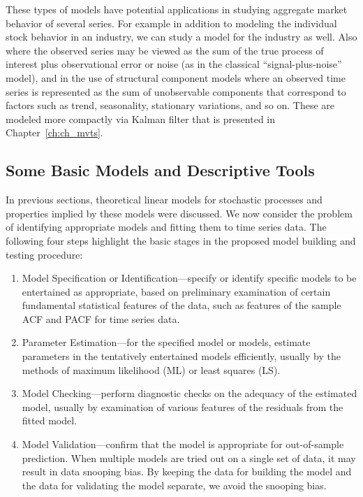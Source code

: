 These types of models have potential applications in studying aggregate market behavior of several series. For example in addition to modeling the individual stock behavior in an industry, we can study a model for the industry as well. Also where the observed series may be viewed as the sum of the true process of interest plus observational error or noise (as in the classical ``signal-plus-noise'' model), and in the use of structural component models where an observed time series is represented as the sum of unobservable components that correspond to factors such as trend, seasonality, stationary variations, and so on. These are modeled more compactly via Kalman filter that is presented in Chapter~\ref{ch:ch_mvts}. 



\subsection{Some Basic Models and Descriptive Tools}


In previous sections, theoretical linear models for stochastic processes and properties implied by these models were discussed. We now consider the problem of identifying appropriate models and fitting them to time series data. The following four steps highlight the basic stages in the proposed model building and testing procedure:

\begin{enumerate}
\item Model Specification or Identification---specify or identify specific models to be entertained as appropriate, based on preliminary examination of certain fundamental statistical features of the data, such as features of the sample ACF and PACF for time series data.

\item Parameter Estimation---for the specified model or models, estimate parameters in the tentatively entertained models efficiently, usually by the methods of maximum likelihood (ML) or least squares (LS).

\item Model Checking---perform diagnostic checks on the adequacy of the estimated model, usually by examination of various features of the residuals from the fitted model.

\item Model Validation---confirm that the model is appropriate for out-of-sample prediction. When multiple models are tried out on a single set of data, it may result in data snooping bias. By keeping the data for building the model and the data for validating the model separate, we avoid the snooping bias.
\end{enumerate}


